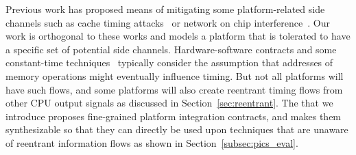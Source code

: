 Previous work has proposed means of mitigating some platform-related side channels such as cache timing attacks~\cite{kar2023mitigating,saileshwar2021mirage,giner2023scatter,werner2019scattercache,qureshi2018ceaser} or network on chip interference~\cite{wassel2013surfnoc,wang2012efficient,schoeberl2012statically,wassel2014networks,psarras2015phasenoc,alonso2019low,sadeghi2019toward,shalaby2021sentry}.
Our work is orthogonal to these works and models a platform that is tolerated to have a specific set of potential side channels.
Hardware-software contracts and some constant-time techniques~\cite{guarnieri2021hardware,wang2023specification,tan2025contractshadowlogic} typically consider the assumption that addresses of memory operations might eventually influence timing.
But not all platforms will have such flows, and some platforms will also create reentrant timing flows from other CPU output signals as discussed in Section~\ref{sec:reentrant}.
The \PICI that we introduce proposes fine-grained platform integration contracts, and makes them synthesizable so that they can directly be used upon techniques that are unaware of reentrant information flows as shown in Section~\ref{subsec:pics_eval}.
